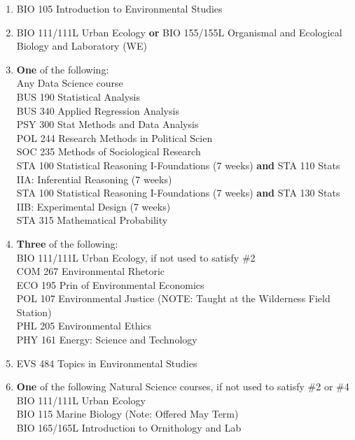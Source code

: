 \documentclass[
  letterpaper,
]{scrbook}
\providecommand{\tightlist}{%
  \setlength{\itemsep}{0pt}\setlength{\parskip}{0pt}}
\begin{document}
\begin{enumerate}
\def\labelenumi{\arabic{enumi}.}
\tightlist
\item
  BIO 105 Introduction to Environmental Studies\\
\item
  BIO 111/111L Urban Ecology \textbf{or} BIO 155/155L Organismal and
  Ecological Biology and Laboratory (WE)\\
\item
  \textbf{One} of the following:\\
  Any Data Science course\\
  BUS 190 Statistical Analysis\\
  BUS 340 Applied Regression Analysis\\
  PSY 300 Stat Methods and Data Analysis\\
  POL 244 Research Methods in Political Scien\\
  SOC 235 Methods of Sociological Research\\
  STA 100 Statistical Reasoning I-Foundations (7 weeks) \textbf{and} STA
  110 Stats IIA: Inferential Reasoning (7 weeks)\\
  STA 100 Statistical Reasoning I-Foundations (7 weeks) \textbf{and} STA
  130 Stats IIB: Experimental Design (7 weeks)\\
  STA 315 Mathematical Probability\\
\item
  \textbf{Three} of the following:\\
  BIO 111/111L Urban Ecology, if not used to satisfy \#2\\
  COM 267 Environmental Rhetoric\\
  ECO 195 Prin of Environmental Economics\\
  POL 107 Environmental Justice (NOTE: Taught at the Wilderness Field
  Station)\\
  PHL 205 Environmental Ethics\\
  PHY 161 Energy: Science and Technology\\
\item
  EVS 484 Topics in Environmental Studies\\
\item
  \textbf{One} of the following Natural Science courses, if not used to
  satisfy \#2 or \#4\\
  BIO 111/111L Urban Ecology\\
  BIO 115 Marine Biology (Note: Offered May Term)\\
  BIO 165/165L Introduction to Ornithology and Lab\\

\end{enumerate}
\end{document}
